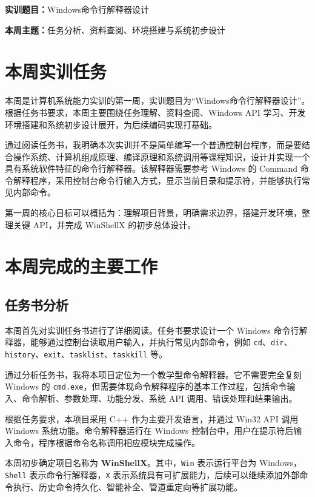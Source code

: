 \documentclass[UTF8]{ctexart}
\begin{document}

\vspace{1em}

\noindent\textbf{实训题目：}Windows命令行解释器设计

\noindent\textbf{本周主题：}任务分析、资料查阅、环境搭建与系统初步设计

\section{本周实训任务}

本周是计算机系统能力实训的第一周，实训题目为“Windows命令行解释器设计”。根据任务书要求，本周主要围绕任务理解、资料查阅、Windows API 学习、开发环境搭建和系统初步设计展开，为后续编码实现打基础。

通过阅读任务书，我明确本次实训并不是简单编写一个普通控制台程序，而是要结合操作系统、计算机组成原理、编译原理和系统调用等课程知识，设计并实现一个具有系统软件特征的命令行解释器。该解释器需要参考 Windows 的 Command 命令解释程序，采用控制台命令行输入方式，显示当前目录和提示符，并能够执行常见内部命令。

第一周的核心目标可以概括为：理解项目背景，明确需求边界，搭建开发环境，整理关键 API，并完成 WinShellX 的初步总体设计。

\section{本周完成的主要工作}

\subsection{任务书分析}

本周首先对实训任务书进行了详细阅读。任务书要求设计一个 Windows 命令行解释器，能够通过控制台读取用户输入，并执行常见内部命令，例如 \texttt{cd}、\texttt{dir}、\texttt{history}、\texttt{exit}、\texttt{tasklist}、\texttt{taskkill} 等。

通过分析任务书，我将本项目定位为一个教学型命令解释器。它不需要完全复刻 Windows 的 \texttt{cmd.exe}，但需要体现命令解释程序的基本工作过程，包括命令输入、命令解析、参数处理、功能分发、系统 API 调用、错误处理和结果输出。

根据任务要求，本项目采用 C++ 作为主要开发语言，并通过 Win32 API 调用 Windows 系统功能。命令解释器运行在 Windows 控制台中，用户在提示符后输入命令，程序根据命令名称调用相应模块完成操作。

本周初步确定项目名称为 \textbf{WinShellX}。其中，\texttt{Win} 表示运行平台为 Windows，\texttt{Shell} 表示命令行解释器，\texttt{X} 表示系统具有可扩展能力，后续可以继续添加外部命令执行、历史命令持久化、智能补全、管道重定向等扩展功能。
\end{document}
